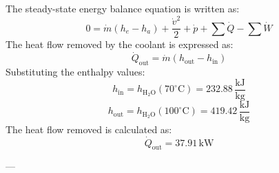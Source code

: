 The steady-state energy balance equation is written as:  
\[
0 = \dot{m}(h_e - h_a) + \frac{\dot{v}^2}{2} + \dot{p} + \sum \dot{Q} - \sum \dot{W}
\]  
The heat flow removed by the coolant is expressed as:  
\[
\dot{Q}_{\text{out}} = \dot{m}(h_{\text{out}} - h_{\text{in}})
\]  
Substituting the enthalpy values:  
\[
h_{\text{in}} = h_{\text{H}_2\text{O}}(70^\circ\text{C}) = 232.88 \, \frac{\text{kJ}}{\text{kg}}
\]  
\[
h_{\text{out}} = h_{\text{H}_2\text{O}}(100^\circ\text{C}) = 419.42 \, \frac{\text{kJ}}{\text{kg}}
\]  
The heat flow removed is calculated as:  
\[
\dot{Q}_{\text{out}} = 37.91 \, \text{kW}
\]  

---